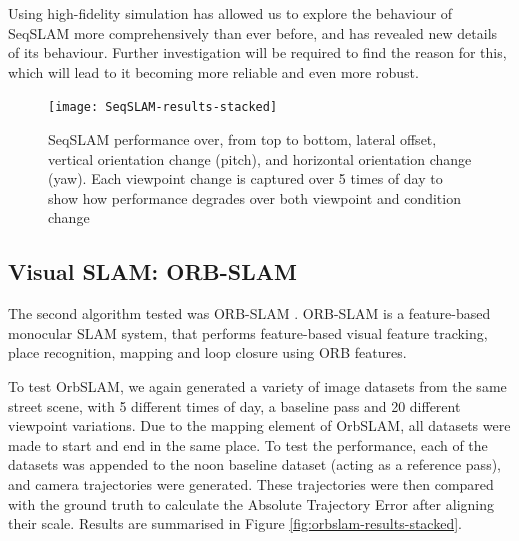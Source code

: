 \documentclass[letterpaper, 10 pt, conference]{ieeeconf}  %
\begin{document}
Using high-fidelity simulation has allowed us to explore the behaviour of SeqSLAM more comprehensively than ever before, and has revealed new details of its behaviour. Further investigation will be required to find the reason for this, which will lead to it becoming more reliable and even more robust.

\begin{figure}[t]
    \centering
    \texttt{[image: SeqSLAM-results-stacked]}
    \caption{SeqSLAM performance over, from top to bottom, lateral offset, vertical orientation change (pitch), and horizontal orientation change (yaw). Each viewpoint change is captured over 5 times of day to show how performance degrades over both viewpoint and condition change}
    \label{fig:seqslam-results-stacked}
\end{figure}




\subsection{Visual SLAM: ORB-SLAM}

The second algorithm tested was ORB-SLAM \cite{Montiel2015}. ORB-SLAM is a feature-based monocular SLAM system, that performs feature-based visual feature tracking, place recognition, mapping and loop closure using ORB features.

To test OrbSLAM, we again generated a variety of image datasets from the same street scene, with 5 different times of day, a baseline pass and 20 different viewpoint variations. Due to the mapping element of OrbSLAM, all datasets were made to start and end in the same place. To test the performance, each of the datasets was appended to the noon baseline dataset (acting as a reference pass), and camera trajectories were generated. These trajectories were then compared with the ground truth to calculate the Absolute Trajectory Error after aligning their scale. Results are summarised in Figure \ref{fig:orbslam-results-stacked}.
\end{document}
